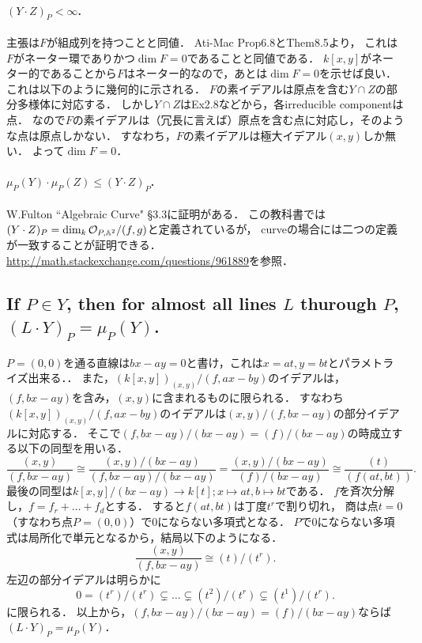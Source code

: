 \documentclass[a4paper]{jsarticle}
\begin{document}
    \paragraph{$(Y \cdot Z)_P < \infty$.}
    主張は$F$が組成列を持つことと同値．
    Ati-Mac Prop6.8とThem8.5より，
    これは$F$がネーター環でありかつ$\dim F=0$であることと同値である．
    $k[x,y]$がネーター的であることから$F$はネーター的なので，あとは$\dim F=0$を示せば良い．
    これは以下のように幾何的に示される．
    $F$の素イデアルは原点を含む$Y \cap Z$の部分多様体に対応する．
    しかし$Y \cap Z$はEx2.8などから，各irreducible componentは点．
    なので$F$の素イデアルは（冗長に言えば）原点を含む点に対応し，そのような点は原点しかない．
    すなわち，$F$の素イデアルは極大イデアル$(x,y)$しか無い．
    よって$\dim F=0$．

    \paragraph{$\mu_P(Y) \cdot \mu_P(Z) \leq (Y \cdot Z)_P$.}
    W.Fulton ``Algebraic Curve" \S 3.3に証明がある．
    この教科書では$(Y \cdot Z)_P=\dim_k \mathcal{O}_{P, \mathbb{A}^2}/(f,g)$と定義されているが，
    curveの場合には二つの定義が一致することが証明できる．
    \url{http://math.stackexchange.com/questions/961889}を参照．

    \subsection{If $P \in Y$, then for almost all lines $L$ thurough $P$, $(L \cdot Y)_P=\mu_P(Y)$.}
    $P=(0,0)$を通る直線は$bx-ay=0$と書け，これは$x=at, y=bt$とパラメトライズ出来る．．
    また，$(k[x,y])_{(x,y)}/(f,ax-by)$のイデアルは，
    $(f,bx-ay)$を含み，$(x,y)$に含まれるものに限られる．
    すなわち$(k[x,y])_{(x,y)}/(f,ax-by)$のイデアルは$(x,y)/(f,bx-ay)$の部分イデアルに対応する．
    そこで$(f,bx-ay)/(bx-ay)=(f)/(bx-ay)$の時成立する以下の同型を用いる．
    \[
        \frac{(x,y)}{(f,bx-ay)}
        \cong \frac{(x,y)/(bx-ay)}{(f,bx-ay)/(bx-ay)}
        =\frac{(x,y)/(bx-ay)}{(f)/(bx-ay)}
        \cong \frac{(t)}{(f(at,bt))}.
    \]
    最後の同型は$k[x,y]/(bx-ay) \to k[t]; x \mapsto at, b \mapsto bt$である．
    $f$を斉次分解し，$f=f_r+\dots+f_d$とする．
    すると$f(at,bt)$は丁度$t^r$で割り切れ，
    商は点$t=0$（すなわち点$P=(0,0)$）で0にならない多項式となる．
    $P$で0にならない多項式は局所化で単元となるから，結局以下のようになる．
    \[ \frac{(x,y)}{(f,bx-ay)} \cong (t)/(t^r). \]
    左辺の部分イデアルは明らかに
    \[ 0=(t^r)/(t^r) \subsetneq \dots \subsetneq (t^2)/(t^r) \subsetneq (t^1)/(t^r). \]
    に限られる．
    以上から，$(f,bx-ay)/(bx-ay)=(f)/(bx-ay)$ならば$(L \cdot Y)_P=\mu_P(Y)$．
\end{document}
